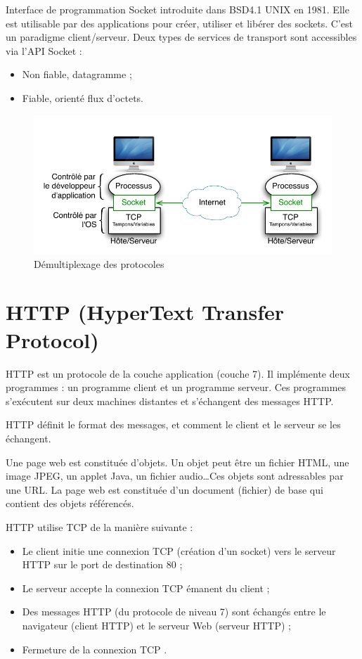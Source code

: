 \documentclass[11pt,english,french]{scrreprt}
\theoremstyle{remark}
\theoremstyle{definition}
\begin{document}
Interface de programmation Socket introduite dans BSD4.1 UNIX en 1981. Elle est utilisable par des applications pour créer, utiliser et libérer des sockets. C'est un paradigme client/serveur. Deux types de services de transport sont accessibles via l'API Socket : \begin{itemize}
	\item Non fiable, datagramme ;
	\item Fiable, orienté flux d'octets.
\end{itemize}

\begin{figure}[h!]
	\center
	\includegraphics[scale=.75]{graphes/socket}
	\caption{Démultiplexage des protocoles}
\end{figure}

\section{HTTP (HyperText Transfer Protocol)}

HTTP est un protocole de la couche application (couche 7). Il implémente deux programmes : un programme client et un programme serveur. Ces programmes s'exécutent sur deux machines distantes et s'échangent des messages HTTP.

HTTP définit le format des messages, et comment le client et le serveur se les échangent.

Une page web est constituée d'objets. Un objet peut être un fichier HTML, une image JPEG, un applet Java, un fichier audio\dots Ces objets sont adressables par une URL. La page web est constituée d'un document (fichier) de base qui contient des objets référencés.

HTTP utilise TCP de la manière suivante : \begin{itemize}
	\item Le client initie une connexion TCP (création d'un socket) vers le serveur HTTP sur le port de destination 80 ;
	\item Le serveur accepte la connexion TCP émanent du client ;
	\item Des messages HTTP (du protocole de niveau 7) sont échangés entre le navigateur (client HTTP) et le serveur Web (serveur HTTP) ;
	\item Fermeture de la connexion TCP .
\end{itemize}
\end{document}
